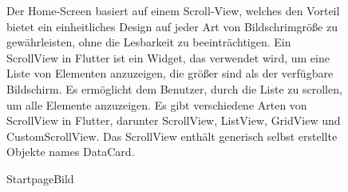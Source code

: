\begin{figure}[h!]
\begin{minipage}[c]{0.5\textwidth}
      \caption{StartpageBild}
    \end{minipage}
    \begin{minipage}[c]{0.5\textwidth}
      \label{fig:Startpagebild}
      Der Home-Screen basiert auf einem Scroll-View,
      welches den Vorteil bietet ein einheitliches Design auf jeder Art von Bildschrimgröße zu gewährleisten, ohne die Lesbarkeit zu beeinträchtigen. 
      Ein ScrollView in Flutter ist ein Widget, das verwendet wird, um eine Liste von Elementen anzuzeigen, die größer sind als der verfügbare Bildschirm. 
      Es ermöglicht dem Benutzer, durch die Liste zu scrollen, um alle Elemente anzuzeigen. Es gibt verschiedene Arten von ScrollView in Flutter, darunter ScrollView, ListView, GridView und CustomScrollView. Das ScrollView enthält generisch selbst erstellte Objekte names DataCard.
    \end{minipage}
  \end{figure}
  \newpage
